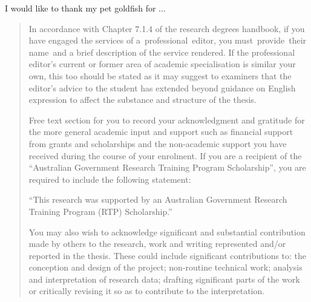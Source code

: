 
I would like to thank my pet goldfish for ...

\begin{quote}
	In accordance with Chapter 7.1.4 of the research degrees handbook, if you have engaged the services of a professional editor, you must provide their name and a brief description of the service rendered. If the professional editor's current or former area of academic specialisation is similar your own, this too should be stated as it may suggest to examiners that the editor's advice to the student has extended beyond guidance on English expression to affect the substance and structure of the thesis.

	Free text section for you to record your acknowledgment and gratitude for the more general academic input and support such as financial support from grants and scholarships and the non-academic support you have received during the course of your enrolment. If you are a recipient of the “Australian Government Research Training Program Scholarship”, you are required to include the following statement:

	“This research was supported by an Australian Government Research Training Program (RTP) Scholarship.”

	You may also wish to acknowledge significant and substantial contribution made by others to the research, work and writing represented and/or reported in the thesis. These could include significant contributions to: the conception and design of the project; non-routine technical work; analysis and interpretation of research data; drafting significant parts of the work or critically revising it so as to contribute to the interpretation.
\end{quote}
